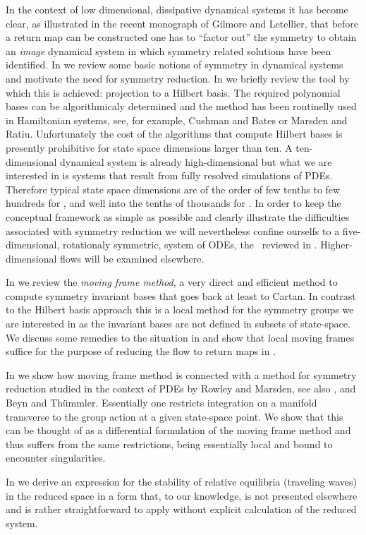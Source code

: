 In the context of low dimensional, dissipative dynamical systems it has become clear, as illustrated
in the recent monograph of Gilmore and Letellier, that before a return
map can be constructed one has to ``factor out'' the symmetry to obtain an \emph{image}
dynamical system in which symmetry related solutions have been identified. In  we
review some basic notions of symmetry in dynamical systems and motivate the need for symmetry 
reduction. In  we briefly review the tool by which this is achieved: projection 
to a Hilbert basis. The required polynomial bases can be algorithmicaly determined
and the method has been routinelly used in Hamiltonian systems, see, for example, 
Cushman and Bates or Marsden and Ratiu. 
Unfortunately the cost of the algorithms that compute Hilbert bases is presently prohibitive 
for state space dimensions larger than ten. A ten-dimensional dynamical system is already high-dimensional
but what we are interested in is systems that result from fully resolved simulations of PDEs.
Therefore typical state space dimensions are of the order of few tenths to few hundreds for \KSe, and
well into the tenths of thousands for \PCf. In order to keep the conceptual framework as simple as possible
and clearly illustrate the difficulties associated with symmetry reduction 
we will nevertheless confine ourselfs to a five-dimensional, rotationaly symmetric, 
system of ODEs, the \CLe\ reviewed in . Higher-dimensional flows will
be examined elsewhere.

In  we review the \emph{moving frame method}, a very direct and efficient method to compute 
symmetry invariant bases that goes back at least to Cartan. In contrast to the Hilbert basis approach this 
is a local method for the symmetry groups we are interested in as the invariant bases are not defined in subsets 
of state-space. We discuss some remedies to the situation 
in  and show that local moving frames 
suffice for the purpose of reducing the flow to return maps in .

In  we show how moving frame method is connected with a method for symmetry reduction studied in
the context of PDEs by Rowley and Marsden, see also , 
and Beyn and Th\"ummler. Essentially one restricts integration on a manifold transverse to 
the group action at a given state-space point. We show that this can be thought of as a differential formulation 
of the moving frame method and thus suffers from the same restrictions, being essentially local and bound to encounter singularities.

In  we derive an expression for the stability of relative equilibria (traveling waves) in the reduced space
in a form that, to our knowledge, is not presented elsewhere and is rather straightforward to apply without explicit calculation of
the reduced system. 






